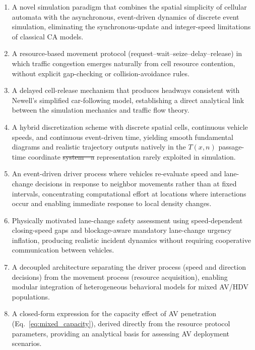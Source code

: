 \documentclass[review,authoryear]{elsarticle}
\providecommand{\DIFaddtex}[1]{{\protect\color{blue}\uwave{#1}}} %
\providecommand{\DIFdeltex}[1]{{\protect\color{red}\sout{#1}}}                      %
\providecommand{\DIFaddbegin}{} %
\providecommand{\DIFaddend}{} %
\providecommand{\DIFdelbegin}{} %
\providecommand{\DIFdelend}{} %
\providecommand{\DIFadd}[1]{\texorpdfstring{\DIFaddtex{#1}}{#1}} %
\providecommand{\DIFdel}[1]{\texorpdfstring{\DIFdeltex{#1}}{}} %
\newcommand{\DIFscaledelfig}{0.5}
\newlength{\DIFdelgraphicswidth} %
\newlength{\DIFdelgraphicsheight} %
\newcommand{\DIFaddincludegraphics}[2][]{{\color{blue}\fbox{\DIFOincludegraphics[#1]{#2}}}} %
\newcommand{\DIFdelincludegraphics}[2][]{%
\sbox{\DIFdelgraphicsbox}{\DIFOincludegraphics[#1]{#2}}%
\settoboxwidth{\DIFdelgraphicswidth}{\DIFdelgraphicsbox} %
\settoboxtotalheight{\DIFdelgraphicsheight}{\DIFdelgraphicsbox} %
\scalebox{\DIFscaledelfig}{%
\parbox[b]{\DIFdelgraphicswidth}{\usebox{\DIFdelgraphicsbox}\\[-\baselineskip] \rule{\DIFdelgraphicswidth}{0em}}\llap{\resizebox{\DIFdelgraphicswidth}{\DIFdelgraphicsheight}{%
\setlength{\unitlength}{\DIFdelgraphicswidth}%
\begin{picture}(1,1)%
\thicklines\linethickness{2pt} %
{\color[rgb]{1,0,0}\put(0,0){\framebox(1,1){}}}%
{\color[rgb]{1,0,0}\put(0,0){\line( 1,1){1}}}%
{\color[rgb]{1,0,0}\put(0,1){\line(1,-1){1}}}%
\end{picture}%
}\hspace*{3pt}}} %
} %
\DeclareRobustCommand{\DIFaddbegin}{\DIFOaddbegin \let\includegraphics\DIFaddincludegraphics} %
\DeclareRobustCommand{\DIFaddend}{\DIFOaddend \let\includegraphics\DIFOincludegraphics} %
\DeclareRobustCommand{\DIFdelbegin}{\DIFOdelbegin \let\includegraphics\DIFdelincludegraphics} %
\DeclareRobustCommand{\DIFdelend}{\DIFOaddend \let\includegraphics\DIFOincludegraphics} %
\begin{document}
\begin{enumerate}
    \item A novel simulation paradigm that combines the spatial simplicity of cellular automata with the asynchronous, event-driven dynamics of discrete event simulation, eliminating the synchronous-update and integer-speed limitations of classical CA models.

    \item A resource-based movement protocol (request--wait--seize--delay--release) in which traffic congestion emerges naturally from cell resource contention, without explicit gap-checking or collision-avoidance rules.

    \item A delayed cell-release mechanism that produces headways consistent with Newell's simplified car-following model, establishing a direct analytical link between the simulation mechanics and traffic flow theory.

    \item A hybrid discretization scheme with discrete spatial cells, continuous vehicle speeds, and continuous event-driven time, yielding smooth fundamental diagrams and realistic trajectory outputs natively in the $T(x,n)$ passage-time coordinate \DIFdelbegin \DIFdel{system---a }\DIFdelend \DIFaddbegin \DIFadd{system, a }\DIFaddend representation rarely exploited in simulation.

    \item An event-driven driver process where vehicles re-evaluate speed and lane-change decisions in response to neighbor movements rather than at fixed intervals, concentrating computational effort at locations where interactions occur and enabling immediate response to local density changes.

    \item Physically motivated lane-change safety assessment using speed-dependent closing-speed gaps and blockage-aware mandatory lane-change urgency inflation, producing realistic incident dynamics without requiring cooperative communication between vehicles.

    \item A decoupled architecture separating the driver process (speed and direction decisions) from the movement process (resource acquisition), enabling modular integration of heterogeneous behavioral models for mixed AV/HDV populations.

    \item A closed-form expression for the capacity effect of AV penetration (Eq.~\ref{eq:mixed_capacity}), derived directly from the resource protocol parameters, providing an analytical basis for assessing AV deployment scenarios.
\end{enumerate}
\end{document}
